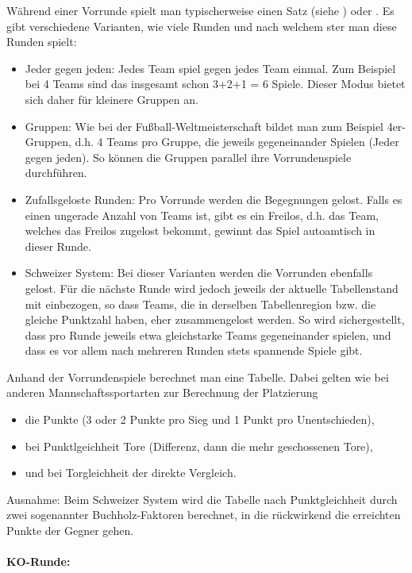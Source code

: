 Während einer Vorrunde spielt man typischerweise einen Satz (siehe ) oder . 
Es gibt verschiedene Varianten, wie viele Runden und nach welchem ster man diese Runden spielt:
\begin{itemize}
\item Jeder gegen jeden: 
Jedes Team spiel gegen jedes Team einmal. 
Zum Beispiel bei 4 Teams sind das insgesamt schon 3+2+1 = 6 Spiele. 
Dieser Modus bietet sich daher für kleinere Gruppen an.
\item Gruppen: 
Wie bei der Fußball-Weltmeisterschaft bildet man zum Beispiel 4er-Gruppen, d.h. 4 Teams pro Gruppe, die jeweils gegeneinander Spielen (Jeder gegen jeden). 
So können die Gruppen parallel ihre Vorrundenspiele durchführen.
\item Zufallsgeloste Runden:
Pro Vorrunde werden die Begegnungen gelost. Falls es einen ungerade Anzahl von Teams ist, gibt es ein Freilos, d.h. das Team, welches das Freilos zugelost bekommt, gewinnt das Spiel autoamtisch in dieser Runde. 
\item Schweizer System:
Bei dieser Varianten werden die Vorrunden ebenfalls gelost. Für die nächste Runde wird jedoch jeweils der aktuelle Tabellenstand mit einbezogen, so dass Teams, die in derselben Tabellenregion bzw. die gleiche Punktzahl haben, eher zusammengelost werden.
So wird sichergestellt, dass pro Runde jeweils etwa gleichstarke Teams gegeneinander spielen, und dass es vor allem nach mehreren Runden stets spannende Spiele gibt.  
\end{itemize}

Anhand der Vorrundenspiele berechnet man eine Tabelle. Dabei gelten wie bei anderen Mannschaftssportarten zur Berechnung der Platzierung
\begin{itemize}
\item die Punkte (3 oder 2 Punkte pro Sieg und 1 Punkt pro Unentschieden), 
\item bei Punktlgeichheit Tore (Differenz, dann die mehr geschossenen Tore),
\item und bei Torgleichheit der direkte Vergleich.
\end{itemize}
Ausnahme: Beim Schweizer System wird die Tabelle nach Punktgleichheit durch zwei sogenannter Buchholz-Faktoren berechnet, in die rückwirkend die erreichten Punkte der Gegner gehen. 


\paragraph{KO-Runde:}
\label{turniere:vorbereitung:spielrunden:ko}

